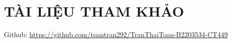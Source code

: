 \documentclass{article} %
\renewcommand{\figurename}{\fontsize{12pt}{0pt}\selectfont \bfseries Hình}
\begin{document}



\tableofcontents
\thispagestyle{empty}
\cleardoublepage


{
  \let\oldnumberline\numberline
  \renewcommand{\numberline}{\figurename~\oldnumberline}
  \listoffigures
}
\cleardoublepage


\newpage
% 

\section*{TÀI LIỆU THAM KHẢO}
\renewcommand\UrlFont{\color{blue}\rmfamily\itshape}
Github: \url{https://github.com/toantran292/TranThaiToan-B2203534-CT449}
\end{document}
